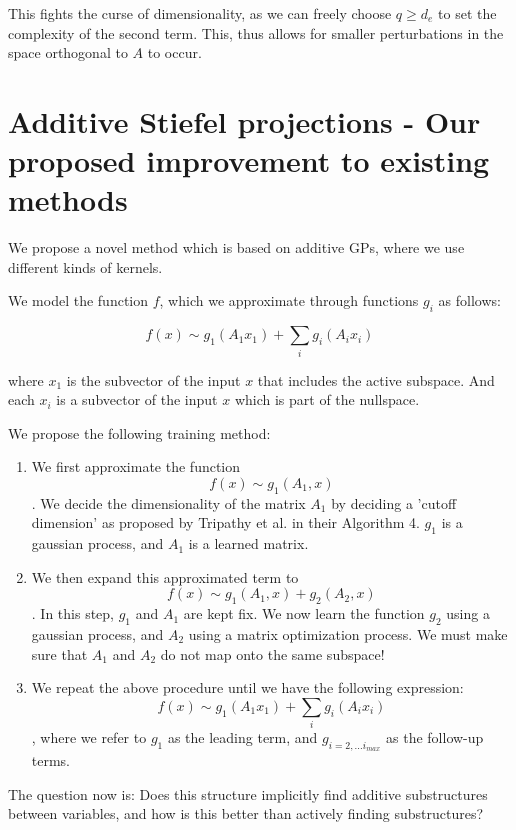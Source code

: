  This fights the curse of dimensionality, as we can freely choose $q \geq d_e$ to set the complexity of the second term.
 This, thus allows for smaller perturbations in the space orthogonal to $A$ to occur.

\section{Additive Stiefel projections - Our proposed improvement to existing methods}
We propose a novel method which is based on additive GPs, where we use different kinds of kernels.

We model the function $f$, which we approximate through functions $g_{i}$ as follows:

\begin{equation}
f(x) \sim g_1(A_1 x_1) + \sum_{i} g_i(A_i x_i)
\end{equation}

where $x_1$ is the subvector of the input $x$ that includes the active subspace.
And each $x_i$ is a subvector of the input $x$ which is part of the nullspace.

We propose the following training method:

\begin{enumerate}
\item We first approximate the function 
$$ f(x) \sim g_1(A_1, x) $$.
We decide the dimensionality of the matrix $A_1$ by deciding a 'cutoff dimension' as proposed by Tripathy et al. in their Algorithm 4.
$g_1$ is a gaussian process, and $A_1$ is a learned matrix.

\item We then expand this approximated term to
$$ f(x) \sim g_1(A_1, x)  + g_2(A_2, x)$$.
In this step, $g_1$ and $A_1$ are kept fix.
We now learn the function $g_2$ using a gaussian process, and $A_2$ using a matrix optimization process.
We must make sure that $A_1$ and $A_2$ do not map onto the same subspace!

\item We repeat the above procedure until we have the following expression:
$$f(x) \sim g_1(A_1 x_1) + \sum_{i} g_i(A_i x_i)$$, where we refer to $g_1$ as the leading term, and $g_{i=2,...i_{max}}$ as the follow-up terms.

\end{enumerate}

The question now is: Does this structure implicitly find additive substructures between variables, and how is this better than actively finding substructures?

